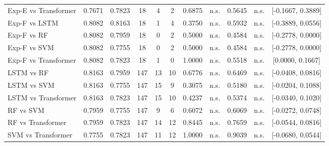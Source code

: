 \begin{table}[htbp]
{\begin{tabular}{l cc c cc cc cc c}
  Exp-E vs Transformer & 0.7671 & 0.7823 & 18 & 4 & 2 & 0.6875 & n.s. & 0.5645 & n.s. & [-0.1667, 0.3889] \\
  Exp-F vs LSTM & 0.8082 & 0.8163 & 18 & 1 & 4 & 0.3750 & n.s. & 0.5932 & n.s. & [-0.3889, 0.0556] \\
  Exp-F vs RF & 0.8082 & 0.7959 & 18 & 0 & 2 & 0.5000 & n.s. & 0.4584 & n.s. & [-0.2778, 0.0000] \\
  Exp-F vs SVM & 0.8082 & 0.7755 & 18 & 0 & 2 & 0.5000 & n.s. & 0.4584 & n.s. & [-0.2778, 0.0000] \\
  Exp-F vs Transformer & 0.8082 & 0.7823 & 18 & 1 & 0 & 1.0000 & n.s. & 0.5518 & n.s. & [0.0000, 0.1667] \\
  LSTM vs RF & 0.8163 & 0.7959 & 147 & 13 & 10 & 0.6776 & n.s. & 0.6469 & n.s. & [-0.0408, 0.0816] \\
  LSTM vs SVM & 0.8163 & 0.7755 & 147 & 15 & 9 & 0.3075 & n.s. & 0.5180 & n.s. & [-0.0204, 0.1088] \\
  LSTM vs Transformer & 0.8163 & 0.7823 & 147 & 15 & 10 & 0.4237 & n.s. & 0.5374 & n.s. & [-0.0340, 0.1020] \\
  RF vs SVM & 0.7959 & 0.7755 & 147 & 9 & 6 & 0.6072 & n.s. & 0.6069 & n.s. & [-0.0272, 0.0748] \\
  RF vs Transformer & 0.7959 & 0.7823 & 147 & 14 & 12 & 0.8445 & n.s. & 0.7659 & n.s. & [-0.0544, 0.0816] \\
  SVM vs Transformer & 0.7755 & 0.7823 & 147 & 11 & 12 & 1.0000 & n.s. & 0.9039 & n.s. & [-0.0680, 0.0544] \\
\bottomrule
\end{tabular}%
}
\end{table}
